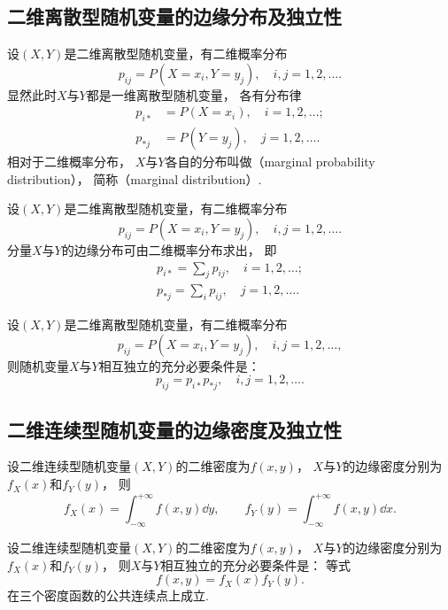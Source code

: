 \subsection{二维离散型随机变量的边缘分布及独立性}
\begin{definition}
设\((X,Y)\)是二维离散型随机变量，有二维概率分布\begin{equation*}
	p_{ij} = P(X=x_i,Y=y_j),
	\quad i,j=1,2,\dotsc.
\end{equation*}
显然此时\(X\)与\(Y\)都是一维离散型随机变量，
各有分布律\begin{align*}
	p_{i*} &= P(X=x_i),
	\quad i=1,2,\dotsc; \\
	p_{*j} &= P(Y=y_j),
	\quad j=1,2,\dotsc.
\end{align*}
相对于二维概率分布，
\(X\)与\(Y\)各自的分布叫做（marginal probability distribution），
简称（marginal distribution）.
\end{definition}

\begin{theorem}
设\((X,Y)\)是二维离散型随机变量，有二维概率分布\begin{equation*}
	p_{ij} = P(X=x_i,Y=y_j),
	\quad i,j=1,2,\dotsc.
\end{equation*}
分量\(X\)与\(Y\)的边缘分布可由二维概率分布求出，
即\begin{gather*}
	p_{i*} = \sum_j p_{ij},
	\quad i=1,2,\dotsc; \\
	p_{*j} = \sum_i p_{ij},
	\quad j=1,2,\dotsc.
\end{gather*}
\end{theorem}

\begin{theorem}\label{theorem:多维随机变量及其分布.两个离散型随机变量相互独立的充分必要条件}
设\((X,Y)\)是二维离散型随机变量，有二维概率分布\begin{equation*}
	p_{ij} = P(X=x_i,Y=y_j),
	\quad i,j=1,2,\dotsc,
\end{equation*}
则随机变量\(X\)与\(Y\)相互独立的充分必要条件是：\begin{equation*}
	p_{ij} = p_{i*} p_{*j},
	\quad i,j=1,2,\dotsc.
\end{equation*}
\end{theorem}

\subsection{二维连续型随机变量的边缘密度及独立性}
\begin{theorem}\label{theorem:多维随机变量及其分布.边缘分布.依据联合密度函数计算边缘密度函数}
设二维连续型随机变量\((X,Y)\)的二维密度为\(f(x,y)\)，
\(X\)与\(Y\)的边缘密度分别为\(f_X(x)\)和\(f_Y(y)\)，
则\begin{equation*}
	f_X(x) = \int_{-\infty}^{+\infty} f(x,y) \dd{y},
	\qquad
	f_Y(y) = \int_{-\infty}^{+\infty} f(x,y) \dd{x}.
\end{equation*}
\end{theorem}

\begin{theorem}\label{theorem:多维随机变量及其分布.两个连续型随机变量相互独立的充分必要条件}
设二维连续型随机变量\((X,Y)\)的二维密度为\(f(x,y)\)，
\(X\)与\(Y\)的边缘密度分别为\(f_X(x)\)和\(f_Y(y)\)，
则\(X\)与\(Y\)相互独立的充分必要条件是：
等式\begin{equation*}
	f(x,y) = f_X(x) f_Y(y).
\end{equation*}
在三个密度函数的公共连续点上成立.
\end{theorem}
